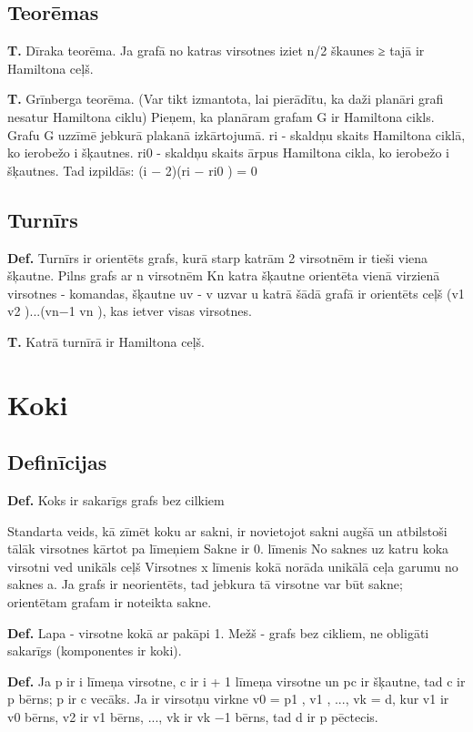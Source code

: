 \documentclass{article}
\begin{document}
\subsection{Teorēmas}

\textbf{T. }Dīraka teorēma. Ja grafā no katras virsotnes iziet n/2 škaunes ≥ tajā ir Hamiltona ceļš.

\textbf{T. }Grīnberga teorēma.  (Var tikt izmantota, lai pierādītu, ka daži planāri grafi nesatur Hamiltona ciklu) Pieņem, ka planāram grafam G ir Hamiltona cikls. Grafu G uzzīmē jebkurā plakanā izkārtojumā.  ri - skaldņu skaits Hamiltona ciklā, ko ierobežo i šķautnes.  ri0 - skaldņu skaits ārpus Hamiltona cikla, ko ierobežo i šķautnes. 
Tad izpildās: (i − 2)(ri − ri0 ) = 0

\subsection{Turnīrs}
\textbf{Def.}  Turnīrs ir orientēts grafs, kurā starp katrām 2 virsotnēm ir tieši viena šķautne. Pilns grafs ar n virsotnēm Kn katra šķautne orientēta vienā virzienā virsotnes - komandas, šķautne uv - v uzvar u katrā šādā grafā ir orientēts ceļš (v1 v2 )...(vn−1 vn ), kas ietver visas virsotnes.

\textbf{T. } Katrā turnīrā ir Hamiltona ceļš.

\section{Koki}

\subsection{Definīcijas}

\textbf{Def.}  Koks ir sakarīgs grafs bez cilkiem

Standarta veids, kā zīmēt koku ar sakni, ir novietojot sakni augšā un atbilstoši tālāk virsotnes kārtot pa līmeņiem Sakne ir 0. līmenis No saknes uz katru koka virsotni ved unikāls ceļš Virsotnes x līmenis kokā norāda unikālā ceļa garumu no saknes a.  Ja grafs ir neorientēts, tad jebkura tā virsotne var būt sakne; orientētam grafam ir noteikta sakne.

\textbf{Def.}  Lapa - virsotne kokā ar pakāpi 1.  Mežš - grafs bez cikliem, ne obligāti sakarīgs (komponentes ir koki).

\textbf{Def.}  Ja p ir i līmeņa virsotne, c ir i + 1 līmeņa virsotne un pc ir šķautne, tad c ir p bērns; p ir c vecāks.  Ja ir virsotņu virkne v0 = p1 , v1 , ..., vk = d, kur v1 ir v0 bērns, v2 ir v1 bērns, ..., vk ir vk −1 bērns, tad d ir p pēctecis.
\end{document}
